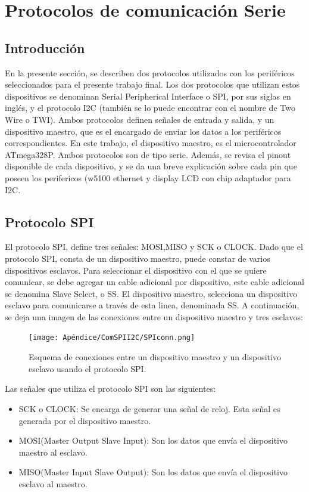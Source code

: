 \renewcommand{\chaptername}{Protocolos de comunicación Serie}
\chapter{Protocolos de comunicación Serie}\label{AP:protSerial}
\section{Introducción}
En la presente sección, se describen dos protocolos utilizados con los periféricos seleccionados para el presente trabajo final. Los dos protocolos que utilizan estos dispositivos se denominan Serial Peripherical Interface o SPI, por sus siglas en inglés, y el protocolo I2C (también se lo puede encontrar con el nombre de Two Wire o TWI). Ambos protocolos definen señales de entrada y salida, y un dispositivo maestro, que es el encargado de enviar los datos a los periféricos correspondientes. En este trabajo, el dispositivo maestro, es el microcontrolador ATmega328P. Ambos protocolos son de tipo serie. Además, se revisa el pinout disponible de cada dispositivo, y se da una breve explicación sobre cada pin que poseen los perifericos (w5100 ethernet y display LCD con chip adaptador para I2C. 


\section{Protocolo SPI}

El protocolo SPI, define tres señales: MOSI,MISO y SCK o CLOCK. Dado que el protocolo SPI, consta de un dispositivo maestro, puede constar de varios dispositivos esclavos. Para seleccionar el dispositivo con el que se quiere comunicar, se debe agregar un cable adicional por dispositivo, este cable adicional se denomina Slave Select, o SS. El dispositivo maestro, selecciona un dispositivo esclavo para comunicarse a través de esta linea, denominada SS. A continuación, se deja una imagen de las conexiones entre un dispositivo maestro y tres esclavos: 

\begin{figure}[H]
	\centering	
	\texttt{[image: Apéndice/ComSPII2C/SPIconn.png]}
	\caption{Esquema de conexiones entre un dispositivo maestro y un dispositivo esclavo usando el protocolo SPI.}
	\label{fig:master_slave_SPI}
\end{figure}

Las señales que utiliza el protocolo SPI son las siguientes: 
\begin{itemize}
	\item SCK o CLOCK: Se encarga de generar una señal de reloj. Esta señal es generada por el dispositivo maestro.
	\item MOSI(Master Output Slave Input): Son los datos que envía el dispositivo maestro al esclavo. 
	\item MISO(Master Input Slave Output): Son los datos que envía el dispositivo esclavo al maestro. 
\end{itemize}

